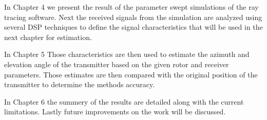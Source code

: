 In Chapter 4 we present the result of the parameter swept simulations of the ray tracing software. Next the received signals from the simulation are analyzed using several DSP techniques to define the signal characteristics that will be used in the next chapter for estimation. 

In Chapter 5 Those characteristics are then used to estimate the azimuth and elevation angle of the transmitter based on the given rotor and receiver parameters. Those estimates are then compared with the original position of the transmitter to determine the methods accuracy.

In Chapter 6 the summery of the results are detailed along with the current limitations. Lastly future improvements on the work will be discussed.